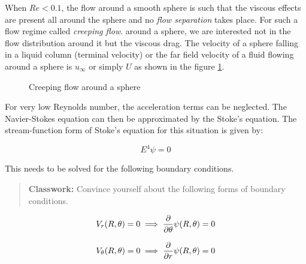 
When $Re < 0.1$, the flow around a smooth sphere is such that the viscous
effects are present all around the sphere and no \textit{flow separation} takes
place. For such a flow regime called \textit{creeping flow}. around a sphere, we
are interested not in the flow distribution around it but the viscous drag. The
velocity of a sphere falling in a liquid column (terminal velocity) or the far
field velocity of a fluid flowing around a sphere is $u_\infty$ or simply $U$ as shown in the
figure \ref{stokes}.

\begin{figure}[h]
\begin{center}
\end{center}
\caption{Creeping flow around a sphere}
\label{stokes}
\end{figure}

For very low Reynolds number, the acceleration terms can be neglected. The Navier-Stokes equation can then be approximated by the Stoke's equation. The stream-function form of Stoke's equation for this situation is given by:

$$ E^4 \psi = 0 $$

This needs to be solved for the following boundary conditions.

\begin{quote}
{\bf Classwork:} Convince yourself about the following forms of boundary conditions.
\end{quote}

$$ V_r(R,\theta) = 0 \implies {\partial \over \partial \theta} \psi(R,\theta) = 0$$

$$ V_\theta(R,\theta) = 0 \implies {\partial \over \partial r} \psi(R,\theta) = 0$$

